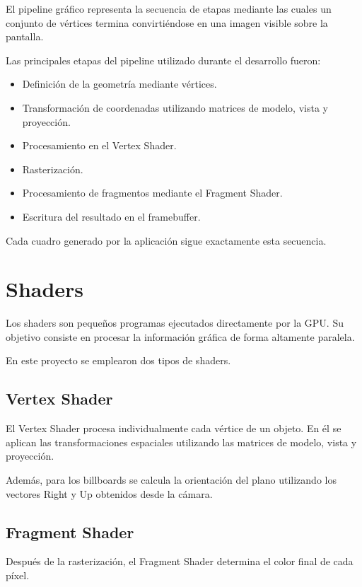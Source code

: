 El pipeline gráfico representa la secuencia de etapas mediante las cuales un conjunto de vértices termina convirtiéndose en una imagen visible sobre la pantalla.

Las principales etapas del pipeline utilizado durante el desarrollo fueron:

\begin{itemize}
\item Definición de la geometría mediante vértices.
\item Transformación de coordenadas utilizando matrices de modelo, vista y proyección.
\item Procesamiento en el Vertex Shader.
\item Rasterización.
\item Procesamiento de fragmentos mediante el Fragment Shader.
\item Escritura del resultado en el framebuffer.
\end{itemize}

Cada cuadro generado por la aplicación sigue exactamente esta secuencia.

\section{Shaders}

Los shaders son pequeños programas ejecutados directamente por la GPU. Su objetivo consiste en procesar la información gráfica de forma altamente paralela.

En este proyecto se emplearon dos tipos de shaders.

\subsection{Vertex Shader}

El Vertex Shader procesa individualmente cada vértice de un objeto. En él se aplican las transformaciones espaciales utilizando las matrices de modelo, vista y proyección.

Además, para los billboards se calcula la orientación del plano utilizando los vectores Right y Up obtenidos desde la cámara.

\subsection{Fragment Shader}

Después de la rasterización, el Fragment Shader determina el color final de cada píxel.

